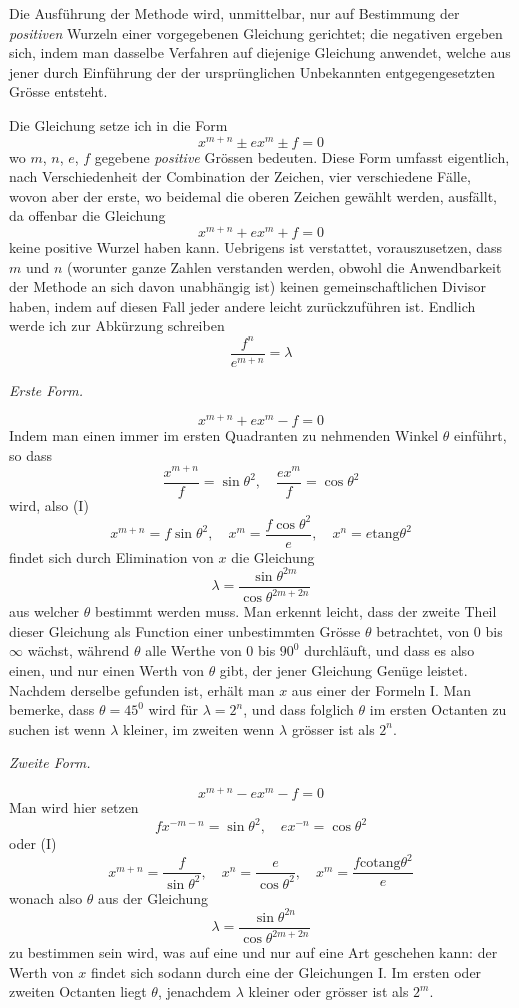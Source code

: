 Die Ausführung der Methode wird, unmittelbar, nur auf Bestimmung der
\textit{positiven} Wurzeln einer vorgegebenen Gleichung gerichtet; die negativen ergeben
sich, indem man dasselbe Verfahren auf diejenige Gleichung anwendet, welche
aus jener durch Einführung der der ursprünglichen Unbekannten entgegengesetzten Grösse entsteht.

Die Gleichung setze ich in die Form
\[
x^{m+n}\pm e x^m\pm f=0
\]
wo $m$, $n$, $e$, $f$ gegebene \textit{positive} Grössen bedeuten. Diese Form umfasst eigentlich, nach Verschiedenheit der Combination der Zeichen, vier verschiedene Fälle,
wovon aber der erste, wo beidemal die oberen Zeichen gewählt werden, ausfällt,
da offenbar die Gleichung
\[
x^{m+n}+e x^m+f=0
\]
keine positive Wurzel haben kann. Uebrigens ist verstattet, vorauszusetzen, dass
$m$ und $n$ (worunter ganze Zahlen verstanden werden, obwohl die Anwendbarkeit
der Methode an sich davon unabhängig ist) keinen gemeinschaftlichen Divisor haben, indem auf diesen Fall jeder andere leicht zurückzuführen ist. Endlich werde
ich zur Abkürzung schreiben
\[
\frac{f^n}{e^{m+n}}=\lambda
\]

\begin{center}\textit{Erste Form.}\end{center}
\[
x^{m+n}+e x^m-f=0
\]
Indem man einen immer im ersten Quadranten zu nehmenden Winkel $\theta$
einführt, so dass
\[
\frac{x^{m+n}}{f}=\sin\theta^2,\quad
\frac{e x^m}{f}=\cos\theta^2
\]
wird, also (I)
\[
x^{m+n}=f\sin\theta^2,\quad
x^m=\frac{f\cos\theta^2}{e},\quad
x^n=e\mathrm{tang}\theta^2
\]
findet sich durch Elimination von $x$ die Gleichung
\[
\lambda=\frac{\sin\theta^{2m}}{\cos\theta^{2m+2n}}
\]
aus welcher $\theta$ bestimmt werden muss. Man erkennt leicht, dass der zweite Theil
dieser Gleichung als Function einer unbestimmten Grösse $\theta$ betrachtet, von $0$
bis $\infty$ wächst, während $\theta$ alle Werthe von $0$ bis $90^0$ durchläuft, und dass es
also einen, und nur einen Werth von $\theta$ gibt, der jener Gleichung Genüge leistet.
Nachdem derselbe gefunden ist, erhält man $x$ aus einer der Formeln I. Man bemerke, dass $\theta=45^0$ wird für $\lambda=2^n$, und dass folglich $\theta$ im ersten Octanten
zu suchen ist wenn $\lambda$ kleiner, im zweiten wenn $\lambda$ grösser ist als $2^n$.

\begin{center}\textit{Zweite Form.}\end{center}
\[
x^{m+n}-ex^m-f=0
\]
Man wird hier setzen
\[
fx^{-m-n}=\sin\theta^2,\quad ex^{-n}=\cos\theta^2
\]
oder (I)
\[
x^{m+n}=\frac{f}{\sin\theta^2},\quad
x^n=\frac{e}{\cos\theta^2},\quad
x^m=\frac{f\mathrm{cotang}\theta^2}{e}
\]
wonach also $\theta$ aus der Gleichung
\[
\lambda=\frac{\sin\theta^{2n}}{\cos\theta^{2m+2n}}
\]
zu bestimmen sein wird, was auf eine und nur auf eine Art geschehen kann: der
Werth von $x$ findet sich sodann durch eine der Gleichungen I. Im ersten oder
zweiten Octanten liegt $\theta$, jenachdem $\lambda$ kleiner oder grösser ist als $2^m$.

